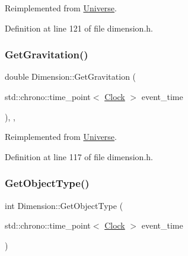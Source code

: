 Reimplemented from \mbox{\hyperlink{class_universe_a9f099605c082e7fa755787a6a8cab7ba}{Universe}}.



Definition at line 121 of file dimension.\+h.

\mbox{\label{class_dimension_a652220a2eb1b26c749ad032865d81788}} 
\subsubsection{\texorpdfstring{Get\+Gravitation()}{GetGravitation()}}
{\footnotesize\ttfamily double Dimension\+::\+Get\+Gravitation (\begin{DoxyParamCaption}\item[{std\+::chrono\+::time\+\_\+point$<$ \mbox{\hyperlink{universe_8h_a0ef8d951d1ca5ab3cfaf7ab4c7a6fd80}{Clock}} $>$}]{event\+\_\+time }\end{DoxyParamCaption})\hspace{0.3cm}{\ttfamily [inline]}, {\ttfamily [final]}, {\ttfamily [virtual]}}



Reimplemented from \mbox{\hyperlink{class_universe_ab0404e774ee0ed66b597ff5b8e989446}{Universe}}.



Definition at line 117 of file dimension.\+h.

\mbox{\label{class_dimension_a72f494215a114cb43cecd9b170bcde51}} 
\subsubsection{\texorpdfstring{Get\+Object\+Type()}{GetObjectType()}}
{\footnotesize\ttfamily int Dimension\+::\+Get\+Object\+Type (\begin{DoxyParamCaption}\item[{std\+::chrono\+::time\+\_\+point$<$ \mbox{\hyperlink{universe_8h_a0ef8d951d1ca5ab3cfaf7ab4c7a6fd80}{Clock}} $>$}]{event\+\_\+time }\end{DoxyParamCaption})\hspace{0.3cm}{\ttfamily [inline]}}



